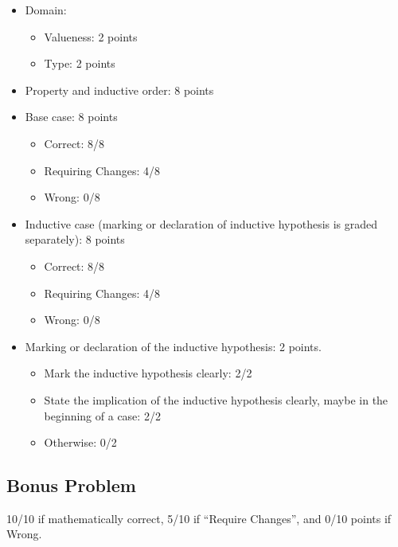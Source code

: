 \documentclass[fleqn]{article}
\begin{document}
\begin{itemize}
  \item Domain:
    \begin{itemize}
      \item Valueness: 2 points
      \item Type: 2 points
    \end{itemize}
  \item Property and inductive order: 8 points
  \item Base case: 8 points
    \begin{itemize}
      \item Correct: 8/8
      \item Requiring Changes: 4/8
      \item Wrong: 0/8
    \end{itemize}
  \item Inductive case (marking or declaration of inductive hypothesis is graded separately): 8 points
    \begin{itemize}
      \item Correct: 8/8
      \item Requiring Changes: 4/8
      \item Wrong: 0/8
    \end{itemize}
  \item Marking or declaration of the inductive hypothesis: 2 points.
    \begin{itemize}
      \item Mark the inductive hypothesis clearly: 2/2
      \item State the implication of the inductive hypothesis clearly, maybe in the beginning of a case: 2/2
      \item Otherwise: 0/2
    \end{itemize}
\end{itemize}

\subsection*{Bonus Problem}

10/10 if mathematically correct, 5/10 if ``Require Changes'', and 0/10 points if Wrong.
\end{document}

